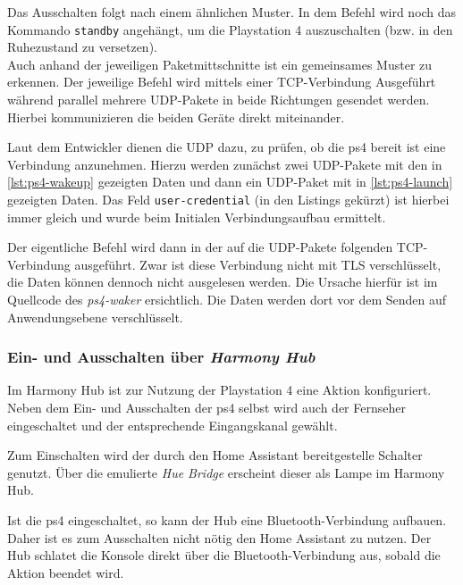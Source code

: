 Das Ausschalten folgt nach einem ähnlichen Muster.
In dem Befehl wird noch das Kommando \texttt{standby} angehängt,
um die Playstation 4 auszuschalten (bzw. in den Ruhezustand zu versetzen). \\

Auch anhand der jeweiligen Paketmittschnitte ist ein gemeinsames Muster zu erkennen.
Der jeweilige Befehl wird mittels einer TCP-Verbindung Ausgeführt
während parallel mehrere UDP-Pakete in beide Richtungen gesendet werden.
Hierbei kommunizieren die beiden Geräte direkt miteinander.

Laut dem Entwickler dienen die UDP dazu, zu prüfen, ob die \ac{ps4} bereit ist eine Verbindung anzunehmen.
Hierzu werden zunächst zwei UDP-Pakete mit den in \autoref{lst:ps4-wakeup} gezeigten Daten
und dann ein UDP-Paket mit in \autoref{lst:ps4-launch} gezeigten Daten.
Das Feld \texttt{user-credential} (in den Listings gekürzt) ist hierbei immer gleich
und wurde beim Initialen Verbindungsaufbau ermittelt.





Der eigentliche Befehl wird dann in der auf die UDP-Pakete folgenden TCP-Verbindung ausgeführt.
Zwar ist diese Verbindung nicht mit TLS verschlüsselt, die Daten können dennoch nicht ausgelesen werden.
Die Ursache hierfür ist im Quellcode des \textit{ps4-waker} ersichtlich.
Die Daten werden dort vor dem Senden auf Anwendungsebene verschlüsselt.

\subsubsection{Ein- und Ausschalten über \textit{Harmony Hub}}
Im Harmony Hub ist zur Nutzung der Playstation 4 eine Aktion konfiguriert.
Neben dem Ein- und Ausschalten der \ac{ps4} selbst wird auch der Fernseher eingeschaltet und der entsprechende Eingangskanal gewählt.

Zum Einschalten wird der durch den Home Assistant bereitgestelle Schalter genutzt. Über die emulierte \textit{Hue Bridge} erscheint dieser als Lampe im Harmony Hub.

Ist die \ac{ps4} eingeschaltet, so kann der Hub eine Bluetooth-Verbindung aufbauen. Daher ist es zum Ausschalten nicht nötig den Home Assistant zu nutzen.
Der Hub schlatet die Konsole direkt über die Bluetooth-Verbindung aus, sobald die Aktion beendet wird.

